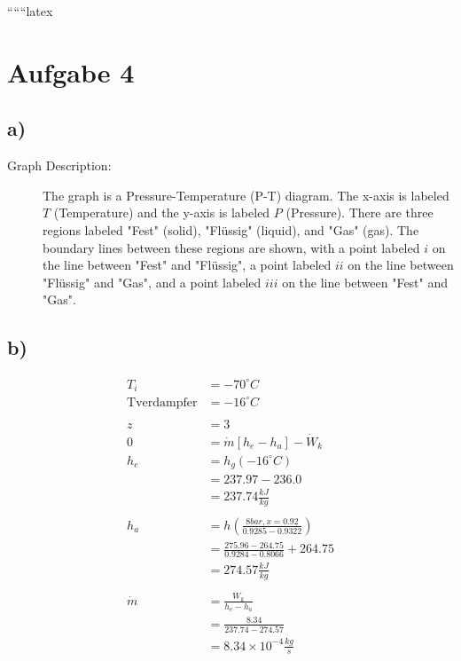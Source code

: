 
``````latex


\section*{Aufgabe 4}

\subsection*{a)}

\begin{description}
    \item[Graph Description:] The graph is a Pressure-Temperature (P-T) diagram. The x-axis is labeled \( T \) (Temperature) and the y-axis is labeled \( P \) (Pressure). There are three regions labeled "Fest" (solid), "Flüssig" (liquid), and "Gas" (gas). The boundary lines between these regions are shown, with a point labeled \( i \) on the line between "Fest" and "Flüssig", a point labeled \( ii \) on the line between "Flüssig" and "Gas", and a point labeled \( iii \) on the line between "Fest" and "Gas".
\end{description}

\subsection*{b)}

\begin{align*}
T_i &= -70^\circ C \\
\text{Tverdampfer} &= -16^\circ C \\
\\
z &= 3 \\
0 &= \dot{m} [h_e - h_a] - \dot{W}_k \\
h_e &= h_{g}(-16^\circ C) \\
&= 237.97 - 236.0 \\
&= 237.74 \frac{kJ}{kg} \\
\\
h_a &= h \left( \frac{8 bar, x=0.92}{0.9285 - 0.9322} \right) \\
&= \frac{275.96 - 264.75}{0.9284 - 0.8066} + 264.75 \\
&= 274.57 \frac{kJ}{kg} \\
\\
\dot{m} &= \frac{\dot{W}_k}{h_e - h_a} \\
&= \frac{8.34}{237.74 - 274.57} \\
&= 8.34 \times 10^{-4} \frac{kg}{s}
\end{align*}

